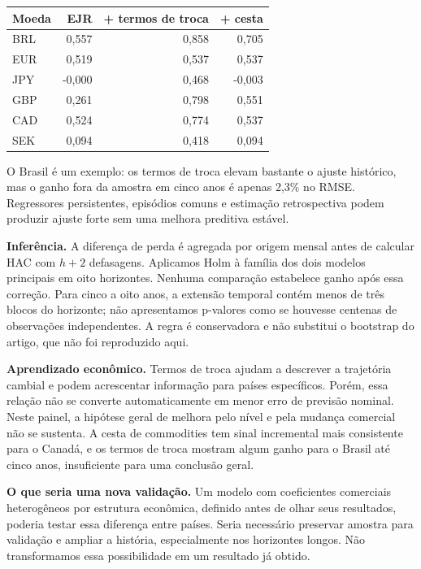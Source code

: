 \documentclass[10pt,a4paper]{article}
\begin{document}
{\normalsize
\begin{center}\begin{tabular}{lrrr}\toprule
Moeda & EJR & + termos de troca & + cesta \\ \midrule
BRL & 0,557 & 0,858 & 0,705 \\
EUR & 0,519 & 0,537 & 0,537 \\
JPY & -0,000 & 0,468 & -0,003 \\
GBP & 0,261 & 0,798 & 0,551 \\
CAD & 0,524 & 0,774 & 0,537 \\
SEK & 0,094 & 0,418 & 0,094 \\\bottomrule\end{tabular}\end{center}}

O Brasil é um exemplo: os termos de troca elevam bastante o ajuste histórico, mas o ganho fora da amostra em cinco anos é apenas 2,3\% no RMSE. Regressores persistentes, episódios comuns e estimação retrospectiva podem produzir ajuste forte sem uma melhora preditiva estável.

\textbf{Inferência.} A diferença de perda é agregada por origem mensal antes de calcular HAC com $h+2$ defasagens. Aplicamos Holm à família dos dois modelos principais em oito horizontes. Nenhuma comparação estabelece ganho após essa correção. Para cinco a oito anos, a extensão temporal contém menos de três blocos do horizonte; não apresentamos p-valores como se houvesse centenas de observações independentes. A regra é conservadora e não substitui o bootstrap do artigo, que não foi reproduzido aqui.

\textbf{Aprendizado econômico.} Termos de troca ajudam a descrever a trajetória cambial e podem acrescentar informação para países específicos. Porém, essa relação não se converte automaticamente em menor erro de previsão nominal. Neste painel, a hipótese geral de melhora pelo nível e pela mudança comercial não se sustenta. A cesta de commodities tem sinal incremental mais consistente para o Canadá, e os termos de troca mostram algum ganho para o Brasil até cinco anos, insuficiente para uma conclusão geral.

\textbf{O que seria uma nova validação.} Um modelo com coeficientes comerciais heterogêneos por estrutura econômica, definido antes de olhar seus resultados, poderia testar essa diferença entre países. Seria necessário preservar amostra para validação e ampliar a história, especialmente nos horizontes longos. Não transformamos essa possibilidade em um resultado já obtido.
\end{document}
